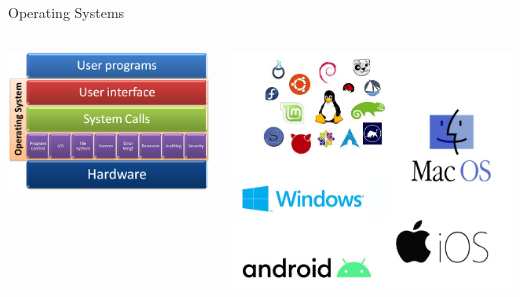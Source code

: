 \documentclass[]{beamer}
\begin{document}
\begin{frame}{Operating Systems}

    \begin{columns}
        \begin{column}{0.5\textwidth}
            \includegraphics[width=\textwidth]{imgs/vis_1.jpg}
        \end{column}
        \begin{column}{0.5\textwidth}
            \includegraphics[width=\textwidth]{imgs/vis_2.jpg}
        \end{column}
    \end{columns}

\end{frame}
\end{document}
